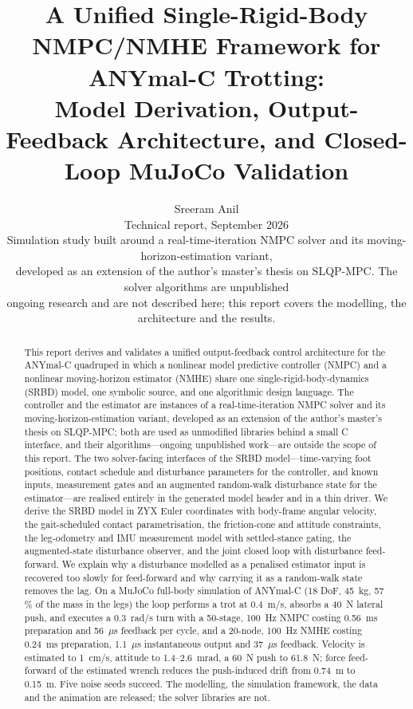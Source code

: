 \documentclass[11pt]{article}
\title{\LARGE A Unified Single-Rigid-Body NMPC/NMHE Framework for\\ ANYmal-C Trotting:\\[2pt] \large Model Derivation, Output-Feedback Architecture, and Closed-Loop MuJoCo Validation}
\author{Sreeram Anil\\[2pt]
\small Technical report, September 2026\\[1pt]
\small Simulation study built around a real-time-iteration NMPC solver and its moving-horizon-estimation variant,\\
\small developed as an extension of the author's master's thesis on SLQP-MPC. The solver algorithms are unpublished\\
\small ongoing research and are not described here; this report covers the modelling, the architecture and the results.}
\date{}
\begin{document}
\maketitle

\begin{abstract}
This report derives and validates a unified output-feedback control architecture for the ANYmal-C quadruped in which a nonlinear model predictive controller (NMPC) and a nonlinear moving-horizon estimator (NMHE) share one single-rigid-body-dynamics (SRBD) model, one symbolic source, and one algorithmic design language. The controller and the estimator are instances of a real-time-iteration NMPC solver and its moving-horizon-estimation variant, developed as an extension of the author's master's thesis on SLQP-MPC; both are used as unmodified libraries behind a small C interface, and their algorithms---ongoing unpublished work---are outside the scope of this report. The two solver-facing interfaces of the SRBD model---time-varying foot positions, contact schedule and disturbance parameters for the controller, and known inputs, measurement gates and an augmented random-walk disturbance state for the estimator---are realised entirely in the generated model header and in a thin driver. We derive the SRBD model in ZYX Euler coordinates with body-frame angular velocity, the gait-scheduled contact parametrisation, the friction-cone and attitude constraints, the leg-odometry and IMU measurement model with settled-stance gating, the augmented-state disturbance observer, and the joint closed loop with disturbance feed-forward. We explain why a disturbance modelled as a penalised estimator input is recovered too slowly for feed-forward and why carrying it as a random-walk state removes the lag. On a MuJoCo full-body simulation of ANYmal-C (18 DoF, 45~kg, 57\,\% of the mass in the legs) the loop performs a trot at 0.4~m/s, absorbs a 40~N lateral push, and executes a 0.3~rad/s turn with a 50-stage, 100~Hz NMPC costing 0.56~ms preparation and 56~$\mu$s feedback per cycle, and a 20-node, 100~Hz NMHE costing 0.24~ms preparation, 1.1~$\mu$s instantaneous output and 37~$\mu$s feedback. Velocity is estimated to 1~cm/s, attitude to 1.4--2.6~mrad, a 60~N push to 61.8~N; force feed-forward of the estimated wrench reduces the push-induced drift from 0.74~m to 0.15~m. Five noise seeds succeed. The modelling, the simulation framework, the data and the animation are released; the solver libraries are not.
\end{abstract}
\end{document}
